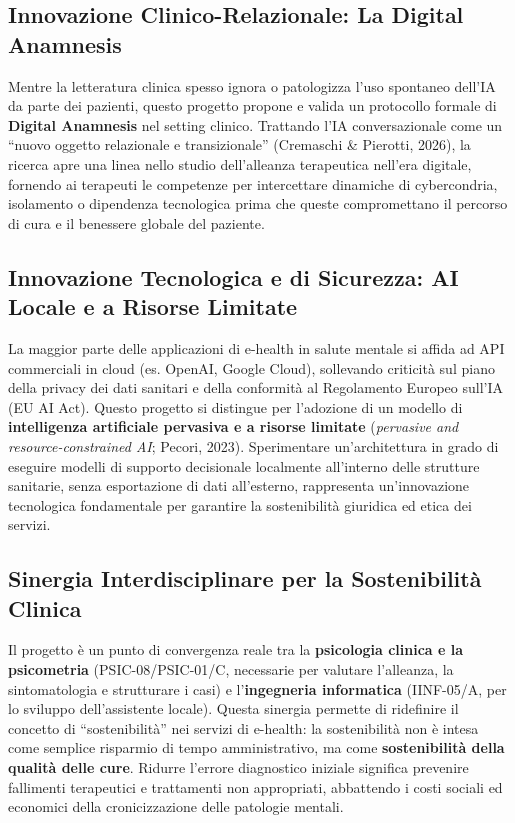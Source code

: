 \documentclass[11pt,a4paper]{article}
\begin{document}
\subsection{Innovazione Clinico-Relazionale: La Digital Anamnesis}
Mentre la letteratura clinica spesso ignora o patologizza l'uso spontaneo dell'IA da parte dei pazienti, questo progetto propone e valida un protocollo formale di \textbf{Digital Anamnesis} nel setting clinico. Trattando l'IA conversazionale come un ``nuovo oggetto relazionale e transizionale'' (Cremaschi \& Pierotti, 2026), la ricerca apre una linea nello studio dell'alleanza terapeutica nell'era digitale, fornendo ai terapeuti le competenze per intercettare dinamiche di cybercondria, isolamento o dipendenza tecnologica prima che queste compromettano il percorso di cura e il benessere globale del paziente.

\subsection{Innovazione Tecnologica e di Sicurezza: AI Locale e a Risorse Limitate}
La maggior parte delle applicazioni di e-health in salute mentale si affida ad API commerciali in cloud (es. OpenAI, Google Cloud), sollevando criticità sul piano della privacy dei dati sanitari e della conformità al Regolamento Europeo sull'IA (EU AI Act). Questo progetto si distingue per l'adozione di un modello di \textbf{intelligenza artificiale pervasiva e a risorse limitate} (\textit{pervasive and resource-constrained AI}; Pecori, 2023). Sperimentare un'architettura in grado di eseguire modelli di supporto decisionale localmente all'interno delle strutture sanitarie, senza esportazione di dati all'esterno, rappresenta un'innovazione tecnologica fondamentale per garantire la sostenibilità giuridica ed etica dei servizi.

\subsection{Sinergia Interdisciplinare per la Sostenibilità Clinica}
Il progetto è un punto di convergenza reale tra la \textbf{psicologia clinica e la psicometria} (PSIC-08/PSIC-01/C, necessarie per valutare l'alleanza, la sintomatologia e strutturare i casi) e l'\textbf{ingegneria informatica} (IINF-05/A, per lo sviluppo dell'assistente locale). Questa sinergia permette di ridefinire il concetto di ``sostenibilità'' nei servizi di e-health: la sostenibilità non è intesa come semplice risparmio di tempo amministrativo, ma come \textbf{sostenibilità della qualità delle cure}. Ridurre l'errore diagnostico iniziale significa prevenire fallimenti terapeutici e trattamenti non appropriati, abbattendo i costi sociali ed economici della cronicizzazione delle patologie mentali.
\end{document}
